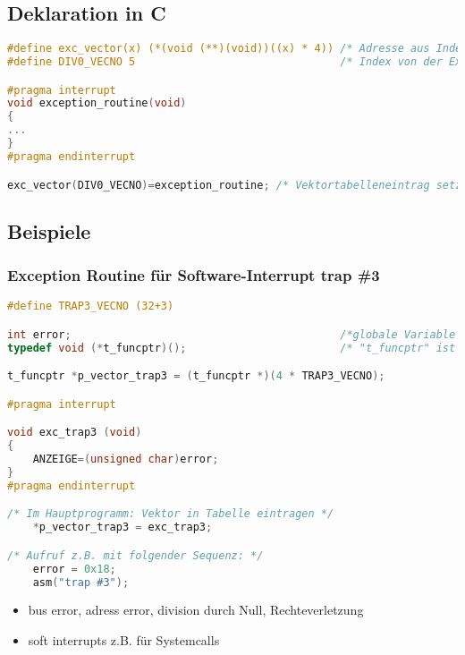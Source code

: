 \subsection{Deklaration in C}
\begin{lstlisting}[language=C]
#define exc_vector(x) (*(void (**)(void))((x) * 4)) /* Adresse aus Index berechnen */
#define DIV0_VECNO 5                                /* Index von der Exception Vector Assignment */

#pragma interrupt
void exception_routine(void)
{
...
}
#pragma endinterrupt

exc_vector(DIV0_VECNO)=exception_routine; /* Vektortabelleneintrag setzen exc_div0 ist ein funktionsname*/
\end{lstlisting}

\subsection{Beispiele} 

\subsubsection{Exception Routine für Software-Interrupt trap \#3}

\begin{lstlisting}[language=C]
#define TRAP3_VECNO (32+3)

int error;                                          /*globale Variable fier Zugriff aus Exception Routine*/
typedef void (*t_funcptr)();                        /* "t_funcptr" ist ein Zeiger auf eine Funktion */

t_funcptr *p_vector_trap3 = (t_funcptr *)(4 * TRAP3_VECNO);

#pragma interrupt

void exc_trap3 (void)
{
	ANZEIGE=(unsigned char)error;
}
#pragma endinterrupt

/* Im Hauptprogramm: Vektor in Tabelle eintragen */
	*p_vector_trap3 = exc_trap3;

/* Aufruf z.B. mit folgender Sequenz: */
	error = 0x18;
	asm("trap #3");
\end{lstlisting}

\begin{itemize}
  \item bus error, adress error, division durch Null, Rechteverletzung
  \item soft interrupts z.B. für Systemcalls
\end{itemize}

